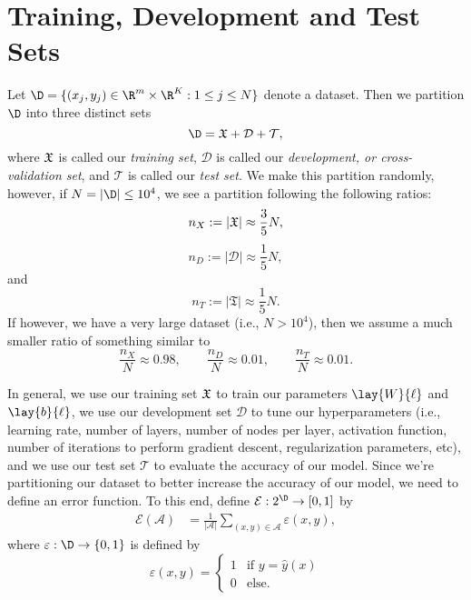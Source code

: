 

\section{Training, Development and Test Sets}

Let $\D=\{(x_j,y_j)\in\R^m\times\R^K:1\leq j\leq N\}$ denote a dataset.  Then we partition $\D$ into three distinct sets
$$\D=\mathfrak{X}+\mathcal{D}+\mathcal{T},$$
where $\frak{X}$ is called our \textit{training set}, $\mathcal{D}$ is called our \textit{development, or cross-validation set}, and $\mathcal{T}$ is called our \textit{test set}. We make this partition randomly, however, if $N=|\D|\leq 10^4$, we see a partition following the following ratios:
$$n_X:=|\frak{X}|\approx \frac{3}{5}N,$$
$$n_D:=|\mathcal{D}|\approx\frac{1}{5}N,$$
and
$$n_T:=|\mathfrak{T}|\approx\frac{1}{5}N.$$
If however, we have a very large dataset (i.e., $N>10^4$), then we assume a much smaller ratio of something similar to
$$\frac{n_X}{N}\approx0.98,\qquad\frac{n_D}{N}\approx 0.01,\qquad\frac{n_T}{N}\approx 0.01.$$

In general, we use our training set $\frak{X}$ to train our parameters $\lay{W}{\ell}$ and $\lay{b}{\ell}$, we use our development set $\mathcal{D}$ to tune our hyperparameters (i.e., learning rate, number of layers, number of nodes per layer, activation function, number of iterations to perform gradient descent, regularization parameters, etc), and we use our test set $\mathcal{T}$ to evaluate the accuracy of our model.  Since we're partitioning our dataset to better increase the accuracy of our model, we need to define an error function.  To this end, define $\mathcal{E}:2^\D\to[0,1]$ by
\begin{align*}
	\mathcal{E}(\mathcal{A})&=\frac{1}{|\mathcal{A}|}\sum_{(x,y)\in\mathcal{A}}\varepsilon(x,y),
\end{align*}
where $\varepsilon:\D\to\{0,1\}$ is defined by
$$\varepsilon(x,y)=\begin{cases}
	1&\text{if }y = \hat{y}(x)\\
	0&\text{else.}
\end{cases}$$

